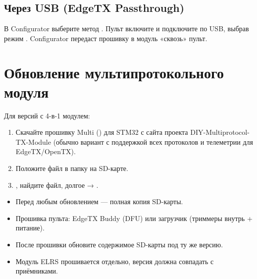 \subsection{Через USB (EdgeTX Passthrough)}

В Configurator выберите метод . Пульт включите и подключите по USB,
выбрав режим . Configurator передаст прошивку в модуль «сквозь» пульт.

\section{Обновление мультипротокольного модуля}

Для версий с 4-в-1 модулем:
\begin{enumerate}
  \item Скачайте прошивку Multi () для STM32 с сайта проекта
        DIY-Multiprotocol-TX-Module (обычно вариант с поддержкой всех протоколов и
        телеметрии для EdgeTX/OpenTX).
  \item Положите файл в папку  на SD-карте.
  \item {}, найдите файл, долгое  → .
\end{enumerate}

\begin{summary}
\begin{itemize}
  \item Перед любым обновлением --- полная копия SD-карты.
  \item Прошивка пульта: EdgeTX Buddy (DFU) или загрузчик (триммеры внутрь + питание).
  \item После прошивки обновите содержимое SD-карты под ту же версию.
  \item Модуль ELRS прошивается отдельно, версия должна совпадать с приёмниками.
\end{itemize}
\end{summary}
